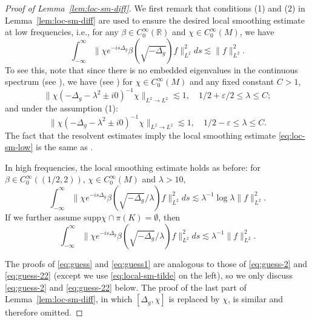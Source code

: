 \documentclass[10pt]{amsart}
\renewcommand{\epsilon}{\varepsilon}
\newcommand{\supp}{\mathrm{supp }}
\newcommand{\1}{{\bf 1}}
\renewcommand{\epsilon}{\varepsilon}
\begin{document}
\begin{proof}[Proof of Lemma~\ref{lem:loc-sm-diff}]
We first remark that conditions (1) and (2) in Lemma~\ref{lem:loc-sm-diff} are used to ensure the desired local smoothing estimate at low frequencies, i.e., for any $\beta\in C_0^{\infty}(\mathbb{R})$ and $\chi\in C_0^{\infty}(M)$, we have
\begin{equation}\label{eq:loc-sm-low}
    \int_{-\infty}^{\infty} \| \chi e^{-is\Delta_g} \beta(\sqrt{-\Delta_g})f\|_{L^2}^2 ds \lesssim \|f\|_{L^2}^2.
\end{equation}
To see this, note that since there is no embedded eigenvalues in the continuous spectrum (see \cite{mazzeo,Vodev}), we have (see \cite[Theorem 5.33]{dyatlov2019mathematical}) for $\chi\in C_0^{\infty}(M)$ and any fixed constant $C>1$,
\begin{equation*}
     \|\chi (-\Delta_g-\lambda^2\pm i0)^{-1} \chi \|_{L^2\to L^2}\lesssim 1, \quad 1/2+\epsilon/2\leq \lambda\leq C;
\end{equation*}
and under the assumption (1):
\begin{equation*}
    \|\chi (-\Delta_g-\lambda^2\pm i0)^{-1} \chi \|_{L^2\to L^2}\lesssim 1,\quad 1/2-\epsilon\leq \lambda\leq C.
\end{equation*}
The fact that the resolvent estimates imply the local smoothing estimate \eqref{eq:loc-sm-low} is the same as \cite[Theorem 7.2]{dyatlov2019mathematical}.

In high frequencies, the local smoothing estimate holds as before: for $\beta\in C_0^{\infty}((1/2,2))$, $\chi\in C_0^{\infty}(M)$ and $\lambda>10$,
\begin{equation}\label{eq:loc-sm-high-0}
    \int_{-\infty}^{\infty} \|\chi e^{-is\Delta_g}\beta(\sqrt{-\Delta_g}/\lambda) f\|_{L^2}^2 ds\lesssim \lambda^{-1} \log \lambda\|f\|_{L^2}^2.
\end{equation}
If we further assume $\supp \chi \cap \pi(K)=\emptyset$, then
\begin{equation}\label{eq:loc-sm-high}
    \int_{-\infty}^{\infty} \|\chi e^{-is\Delta_g}\beta(\sqrt{-\Delta_g}/\lambda) f\|_{L^2}^2 ds\lesssim \lambda^{-1} \|f\|_{L^2}^2.
\end{equation}






The proofs of \eqref{eq:guess} and \eqref{eq:guess1} are analogous to those of \eqref{eq:guess-2} and \eqref{eq:guess-22} (except we use \eqref{eq:local-sm-tilde} on the left), so we only discuss \eqref{eq:guess-2} and \eqref{eq:guess-22} below. The proof of the last part of Lemma~\ref{lem:loc-sm-diff}, in which $[\Delta_g,\chi]$ is replaced by $\chi$, is similar and therefore omitted.


\end{proof}
\end{document}
